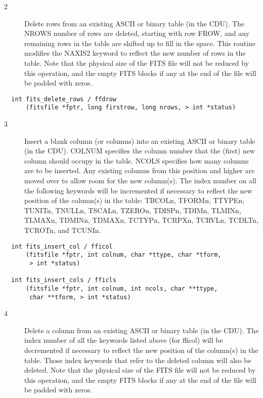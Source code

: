 \begin{description}
\item[2 ] Delete rows from an existing ASCII or binary table (in the CDU).
    The NROWS number of rows are deleted, starting with row FROW, and
    any remaining rows in the table are shifted up to fill in the space.
    This routine modifies the NAXIS2 keyword to reflect the new number
    of rows in the table.  Note that the physical size of the FITS file will
    not be reduced by this operation, and the empty FITS blocks if any
   at the end of the file will be padded with zeros.
\end{description}

\begin{verbatim}
  int fits_delete_rows / ffdrow
      (fitsfile *fptr, long firstrow, long nrows, > int *status)
\end{verbatim}

\begin{description}
\item[3 ] Insert a blank column (or columns) into an existing ASCII or binary
    table (in the CDU).  COLNUM specifies the column number that the (first)
    new column should occupy in the table.  NCOLS specifies how many
    columns are to be inserted. Any existing columns from this position and
    higher are moved over to allow room for the new column(s).
    The index number on all the following keywords will be incremented
    if necessary to reflect the new position of the column(s) in the table:
    TBCOLn, TFORMn, TTYPEn, TUNITn, TNULLn, TSCALn, TZEROn, TDISPn, TDIMn,
    TLMINn, TLMAXn, TDMINn, TDMAXn, TCTYPn, TCRPXn, TCRVLn, TCDLTn, TCROTn,
   and TCUNIn.
\end{description}

\begin{verbatim}
  int fits_insert_col / fficol
      (fitsfile *fptr, int colnum, char *ttype, char *tform,
       > int *status)

  int fits_insert_cols / fficls
      (fitsfile *fptr, int colnum, int ncols, char **ttype,
       char **tform, > int *status)
\end{verbatim}

\begin{description}
\item[4 ] Delete a column from an existing ASCII or binary table (in the CDU).
    The index number of all the keywords listed above (for fficol) will be
    decremented if necessary to reflect the new position of the column(s) in
    the table.  Those index keywords that refer to the deleted column will
    also be deleted.  Note that the physical size of the FITS file will
    not be reduced by this operation, and the empty FITS blocks if any
   at the end of the file will be padded with zeros.
\end{description}

